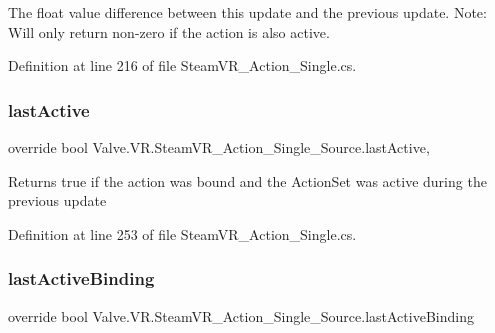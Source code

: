 The float value difference between this update and the previous update. Note\+: Will only return non-\/zero if the action is also active. 



Definition at line 216 of file Steam\+V\+R\+\_\+\+Action\+\_\+\+Single.\+cs.

\mbox{\label{class_valve_1_1_v_r_1_1_steam_v_r___action___single___source_a440bc873993ecf1c76706916bc480527}} 
\subsubsection{\texorpdfstring{lastActive}{lastActive}}
{\footnotesize\ttfamily override bool Valve.\+V\+R.\+Steam\+V\+R\+\_\+\+Action\+\_\+\+Single\+\_\+\+Source.\+last\+Active\hspace{0.3cm}{\ttfamily [get]}, {}}



Returns true if the action was bound and the Action\+Set was active during the previous update 



Definition at line 253 of file Steam\+V\+R\+\_\+\+Action\+\_\+\+Single.\+cs.

\mbox{\label{class_valve_1_1_v_r_1_1_steam_v_r___action___single___source_a81560dba183aa6a6b4df61a0e3f09663}} 
\subsubsection{\texorpdfstring{lastActiveBinding}{lastActiveBinding}}
{\footnotesize\ttfamily override bool Valve.\+V\+R.\+Steam\+V\+R\+\_\+\+Action\+\_\+\+Single\+\_\+\+Source.\+last\+Active\+Binding\hspace{0.3cm}{\ttfamily [get]}}



